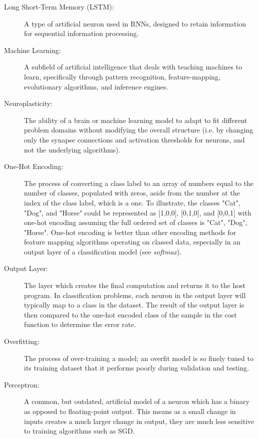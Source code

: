 \documentclass[]{report}
\begin{document}
\begin{description}
\item[Long Short-Term Memory (LSTM):] A type of artificial neuron used in RNNs, designed to retain information for sequential information processing.

\item[Machine Learning:] A subfield of artificial intelligence that deals with teaching machines to learn, specifically through pattern recognition, feature-mapping, evolutionary algorithms, and inference engines.

\item[Neuroplasticity:] The ability of a brain or machine learning model to adapt to fit different problem domains without modifying the overall structure (i.e. by changing only the synapse connections and activation thresholds for neurons, and not the underlying algorithms).

\item[One-Hot Encoding:] The process of converting a class label to an array of numbers equal to the number of classes, populated with zeros, aside from the number at the index of the class label, which is a one. To illustrate, the classes "Cat", "Dog", and "Horse" could be represented as [1,0,0], [0,1,0], and [0,0,1] with one-hot encoding assuming the full ordered set of classes is {"Cat", "Dog", "Horse"}. One-hot encoding is better than other encoding methods for feature mapping algorithms operating on classed data, especially in an output layer of a classification model (see \emph{softmax}).

\item[Output Layer:] The layer which creates the final computation and returns it to the host program. In classification problems, each neuron in the output layer will typically map to a class in the dataset. The result of the output layer is then compared to the one-hot encoded class of the sample in the cost function to determine the error rate.

\item[Overfitting:] The process of over-training a model; an overfit model is so finely tuned to its training dataset that it performs poorly during validation and testing.

\item[Perceptron:] A common, but outdated, artificial model of a neuron which has a binary as opposed to floating-point output. This means as a small change in inputs creates a much larger change in output, they are much less sensitive to training algorithms such as SGD.


\end{description}
\end{document}
